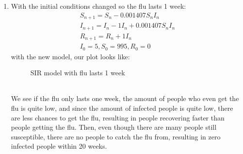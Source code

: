 \documentclass[12pt,letterpaper]{article}
\begin{document}
\begin{enumerate}
\begin{enumerate}
  \item With the initial conditions changed so the flu lasts 1 week: 
  \begin{eqnarray*}
    S_{n+1} = S_{n} - 0.001407S_{n}I_{n}\\
    I_{n+1} = I_{n} - 1I_{n} + 0.001407S_{n}I_{n}\\
    R_{n+1} = R_{n} + 1I_{n} \\
    I_{0} = 5, S_{0} = 995, R_{0} = 0
  \end{eqnarray*}
  with the new model, our plot looks like: 
  \begin{figure}[!htb]
    \caption{\label{fig:11} SIR model with flu lasts 1 week}
  \end{figure}\\
  We see if the flu only lasts one week, the amount of people who even get the flu is 
  quite low, and since the amount of infected people is quite low, there are less chances
  to get the flu, resulting in people recovering faster than people getting the flu. Then, 
  even though there are many people still susceptible, there are no people to catch the 
  flu from, resulting in zero infected people within 20 weeks. 


\end{enumerate}
\end{enumerate}
\end{document}
